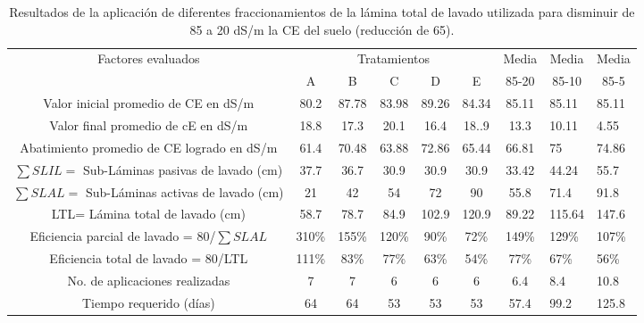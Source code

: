 \begin{table}[h!]
    \centering
    \begin{tabular}{@{}cccccccll@{}}
    \toprule
    \multirow{2}{*}{Factores evaluados}             & \multicolumn{5}{c}{Tratamientos}      & Media & \multicolumn{1}{c}{Media} & Media \\ \cmidrule(l){2-9} 
                                                    & A     & B    & C    & D     & E     & 85-20 & \multicolumn{1}{c}{85-10} & \multicolumn{1}{c}{85-5} \\ \midrule
    Valor inicial promedio de CE en dS/m            & 80.2  & 87.78 & 83.98 & 89.26 & 84.34 & 85.11 & 85.11                     & 85.11 \\
    Valor final promedio de cE en dS/m              & 18.8  & 17.3 & 20.1 & 16.4  & 18..9 & 13.3  & 10.11                     & 4.55                     \\
    Abatimiento promedio de CE logrado en dS/m      & 61.4  & 70.48 & 63.88 & 72.86 & 65.44 & 66.81 & 75                        & 74.86 \\
    $\sum SLIL=$ Sub-Láminas pasivas de lavado (cm) & 37.7  & 36.7  & 30.9  & 30.9  & 30.9  & 33.42 & 44.24                     & 55.7  \\
    $\sum SLAL=$ Sub-Láminas activas de lavado (cm) & 21    & 42   & 54   & 72    & 90    & 55.8  & 71.4                      & 91.8                     \\
    LTL= Lámina total de lavado (cm)                & 58.7  & 78.7 & 84.9 & 102.9 & 120.9 & 89.22 & 115.64                    & 147.6                    \\
    Eficiencia parcial de lavado = 80/$\sum SLAL$   & 310\% & 155\% & 120\% & 90\%  & 72\%  & 149\% & 129\%                     & 107\% \\
    Eficiencia total de lavado = 80/LTL             & 111\% & 83\% & 77\% & 63\%  & 54\%  & 77\%  & 67\%                      & 56\%                     \\
    No. de aplicaciones realizadas                  & 7     & 7    & 6    & 6     & 6     & 6.4   & 8.4                       & 10.8                     \\
    Tiempo requerido (días)                         & 64    & 64   & 53   & 53    & 53    & 57.4  & 99.2                      & 125.8                    \\ \bottomrule
    \end{tabular}
    \caption{Resultados de la aplicación de diferentes fraccionamientos de la lámina total de lavado utilizada para disminuir de 85 a 20 dS/m la CE del suelo (reducción de 65).}
    \label{tabsa38}
\end{table}

